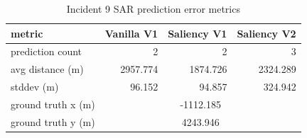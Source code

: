 \begin{table}[ht]
\centering
\caption{Incident 9 SAR prediction error metrics}
\label{tab:sar-incident-9}
\begin{tabular}{lrrr}
\hline
metric & Vanilla V1 & Saliency V1 & Saliency V2 \\
\hline
prediction count & 2 & 2 & 3 \\
avg distance (m) & 2957.774 & 1874.726 & 2324.289 \\
stddev (m) & 96.152 & 94.857 & 324.942 \\
ground truth x (m) & \multicolumn{3}{c}{-1112.185} \\
ground truth y (m) & \multicolumn{3}{c}{4243.946} \\
\hline
\end{tabular}
\end{table}
